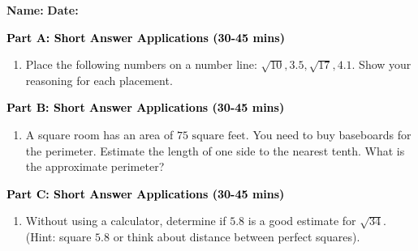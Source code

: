 \documentclass[12pt, letterpaper, fleqn]{article}
\begin{document}
\textbf{Name:} \underline{\hspace{5cm}}
\hfill
\textbf{Date:} \underline{\hspace{3cm}}\\


\begin{tcolorbox}[colback=customteal!20]
\large\textcolor{black}{\textbf{Part A: Short Answer Applications (30-45 mins)}}
\end{tcolorbox}

\vspace{3mm}

\begin{enumerate}[itemsep=4.2cm, leftmargin=0.6cm]
\item Place the following numbers on a number line: $\sqrt{10}, 3.5, \sqrt{17}, 4.1$. Show your reasoning for each placement.
\end{enumerate}

\newpage

\begin{tcolorbox}[colback=customteal!20]
\large\textcolor{black}{\textbf{Part B: Short Answer Applications (30-45 mins)}}
\end{tcolorbox}

\vspace{3mm}

\begin{enumerate}[itemsep=4.2cm, leftmargin=0.6cm, resume]
\item A square room has an area of $75\text{ square feet}$. You need to buy baseboards for the perimeter. Estimate the length of one side to the nearest tenth. What is the approximate perimeter?
\end{enumerate}

\newpage

\begin{tcolorbox}[colback=customteal!20]
\large\textcolor{black}{\textbf{Part C: Short Answer Applications (30-45 mins)}}
\end{tcolorbox}

\vspace{3mm}

\begin{enumerate}[itemsep=4.2cm, leftmargin=0.6cm, resume]
\item Without using a calculator, determine if $5.8$ is a good estimate for $\sqrt{34}$. (Hint: square $5.8$ or think about distance between perfect squares).
\end{enumerate}
\end{document}
